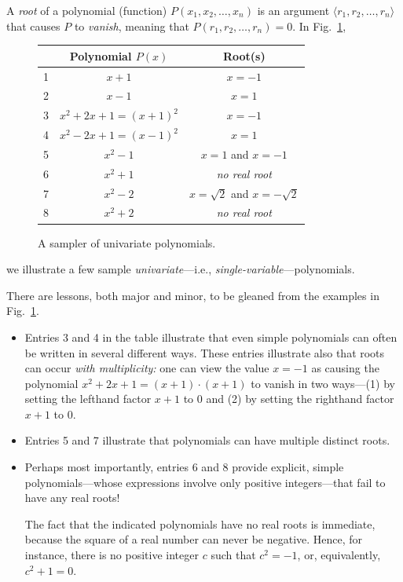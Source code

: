 \bigskip


A {\it root}  of a
polynomial (function) $P(x_1, x_2, \ldots, x_n)$ is an argument $\langle r_1, r_2, \ldots, r_n \rangle$ that causes $P$ to {\it vanish}, meaning that $P(r_1, r_2, \ldots, r_n) = 0$.  In Fig.~\ref{fig:sample-polys},
 \begin{figure}[htb]
\begin{center}
\begin{tabular}{|c|c|c|}
\hline
 & Polynomial $P(x)$ & Root(s) \\
\hline
1 &
$x+1$  &  $x= -1$ \\
2 &
$x-1$  &  $x= 1$ \\
3 &
$x^2 + 2x +1 = (x+1)^2$ & $x = -1$ \\ 
4 &
$x^2 - 2x +1 = (x-1)^2$ & $x = 1$ \\ 
5 &
$x^2 - 1$ & $x = 1$ and $x= -1$ \\
6 &
$x^2 + 1$ & {\em no real root} \\
7 &
$x^2 -2$  & $x = \sqrt{2}$ and $x = - \sqrt{2}$ \\
8 &
$x^2 + 2$ & {\em no real root} \\
\hline
\end{tabular}
\end{center} 
 \caption{A sampler of univariate polynomials.}
 \label{fig:sample-polys}
 \end{figure}
we illustrate a few sample {\em univariate}---i.e., {\em single-variable}---polynomials.  

\medskip

\noindent
There are lessons, both major and minor, to be gleaned from the examples in Fig.~\ref{fig:sample-polys}.
\begin{itemize}
\item
Entries 3 and 4 in the table illustrate that even simple polynomials can often be written in several different ways.  These entries illustrate also that roots can occur {\em with multiplicity:} one can view the value $x = -1$ as causing the polynomial $x^2 + 2x +1 = (x+1)\cdot (x+1)$ to vanish
in two ways---(1) by setting the lefthand factor $x+1$ to $0$ and (2) by setting the righthand factor $x+1$ to $0$.


\item
Entries 5 and 7 illustrate that polynomials can have multiple distinct roots.

\item
Perhaps most importantly, entries 6 and 8 provide explicit, simple polynomials---whose expressions involve only positive integers---that fail to have any real roots!

\smallskip

The fact that the indicated polynomials have no real roots is immediate, because the square of a real number can never be negative. Hence, for instance, there is no positive integer $c$ such that $c^2 = -1$, or, equivalently, $c^2 + 1 = 0$.
\end{itemize}

